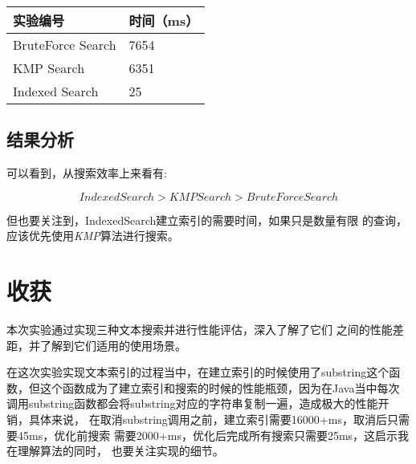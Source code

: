 \documentclass[12pt,a4paper]{ctexart}
\begin{document}
\begin{table}[htbp]
    \centering
    \begin{tabular}{|l|l|}
        \hline
        实验编号          & 时间（ms） \\ \hline
        BruteForce Search & 7654       \\ \hline
        KMP Search        & 6351       \\ \hline
        Indexed Search    & 25         \\ \hline
    \end{tabular}
\end{table}
\subsection{结果分析}

可以看到，从搜索效率上来看有:

\begin{equation}
    \nonumber
    IndexedSearch > KMPSearch > BruteForce Search
\end{equation}

但也要关注到，IndexedSearch建立索引的需要时间，如果只是数量有限
的查询，应该优先使用\textit{KMP}算法进行搜索。


\section{收获}
本次实验通过实现三种文本搜索并进行性能评估，深入了解了它们
之间的性能差距，并了解到它们适用的使用场景。

在这次实验实现文本索引的过程当中，在建立索引的时候使用了substring这个函数，但这个函数成为了建立索引和搜索的时候的性能瓶颈，因为在Java当中每次
调用substring函数都会将substring对应的字符串复制一遍，造成极大的性能开销，具体来说，
在取消substring调用之前，建立索引需要16000+ms，取消后只需要45ms，优化前搜索
需要2000+ms，优化后完成所有搜索只需要25ms，这启示我在理解算法的同时，
也要关注实现的细节。
\end{document}
